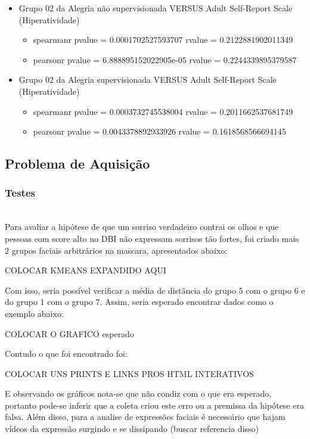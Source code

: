 \begin{itemize}
    \item Grupo 02 da Alegria não supervisionada VERSUS Adult Self-Report Scale (Hiperatividade)
    \begin{itemize}
        \item spearmanr
            \subitem pvalue = 0.0001702527593707
            \subitem rvalue = 0.2122881902011349
        \item pearsonr
            \subitem pvalue = 6.888895152022905e-05
            \subitem rvalue = 0.2244339895379587
    \end{itemize}
\item Grupo 02 da Alegria supervisionada VERSUS Adult Self-Report Scale (Hiperatividade)
    \begin{itemize}
        \item spearmanr
            \subitem pvalue = 0.0003732745538004
            \subitem rvalue = 0.2011662537681749
        \item pearsonr
            \subitem pvalue = 0.0043378892933926
            \subitem rvalue = 0.1618568566694145
    \end{itemize}
\end{itemize}


\subsection{Problema de Aquisição}

\subsubsection{Testes}\mbox{}\\

Para avaliar a hipótese de que um sorriso verdadeiro contrai os olhos e que pessoas com score alto no DBI não expressam sorrisos tão fortes, foi criado mais 2 grupos faciais arbitrários na mascara, apresentados abaixo:

COLOCAR KMEANS EXPANDIDO AQUI

Com isso, seria possível verificar a média de distância do grupo 5 com o grupo 6 e do grupo 1 com o grupo 7. Assim, seria esperado encontrar dados como o exemplo abaixo:

COLOCAR O GRAFICO esperado

Contudo o que foi encontrado foi:

COLOCAR UNS PRINTS E LINKS PROS HTML INTERATIVOS

E observando os gráficos nota-se que não condiz com o que era esperado, portanto pode-se inferir que a coleta criou este erro ou a premissa da hipótese era falsa.
Além disso, para a analise de expressões faciais é necessário que hajam vídeos da expressão surgindo e se dissipando (buscar referencia disso)